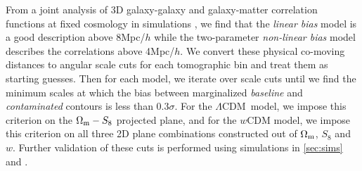 \documentclass[aps, prd,twocolumn,superscriptaddress,nofootinbib,preprintnumbers]{revtex4-1}
\newcommand{\lcdm}{$\Lambda$CDM}
\begin{document}
From a joint analysis of 3D galaxy-galaxy and galaxy-matter correlation functions at fixed cosmology in simulations \citep{p2020perturbation}, we find that the \textit{linear bias} model is a good description above 8Mpc/$h$ while the two-parameter \textit{non-linear bias} model describes the correlations above 4Mpc/$h$. We convert these physical co-moving distances to angular scale cuts for each tomographic bin and treat them as starting guesses. Then for each model, we iterate over scale cuts until we find the minimum scales at which the bias between marginalized \textit{baseline} and \textit{contaminated} contours is less than $0.3\sigma$. For the \lcdm\ model, we impose this criterion on the $\Omega_{\rm m}-S_8$ projected plane, and for the $w$CDM model, we impose this criterion on all three 2D plane combinations constructed out of $\Omega_{\rm m}$, $S_8$ and $w$. Further validation of these cuts is performed using simulations in \ref{sec:sims} and \citet*{y3-simvalidation}. 


 



\end{document}
